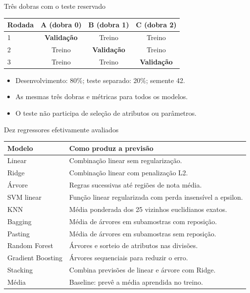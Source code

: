 \begin{frame}{Três dobras com o teste reservado}
\centering\begin{tabular}{lccc}\toprule Rodada & A (dobra 0) & B (dobra 1) & C (dobra 2)\\\midrule 1 & \textbf{Validação} & Treino & Treino\\2 & Treino & \textbf{Validação} & Treino\\3 & Treino & Treino & \textbf{Validação}\\\bottomrule\end{tabular}
\vspace{4mm}\begin{itemize}\item Desenvolvimento: 80\%; teste separado: 20\%; semente 42.
\item As mesmas três dobras e métricas para todos os modelos.
\item O teste não participa de seleção de atributos ou parâmetros.\end{itemize}
\end{frame}
\begin{frame}{Dez regressores efetivamente avaliados}
\small\begin{tabular}{p{3.1cm}p{10cm}}\toprule Modelo & Como produz a previsão\\\midrule
Linear & Combinação linear sem regularização.\\
Ridge & Combinação linear com penalização L2.\\
Árvore & Regras sucessivas até regiões de nota média.\\
SVM linear & Função linear regularizada com perda insensível a epsilon.\\
KNN & Média ponderada dos 25 vizinhos euclidianos exatos.\\
Bagging & Média de árvores em subamostras com reposição.\\
Pasting & Média de árvores em subamostras sem reposição.\\
Random Forest & Árvores e sorteio de atributos nas divisões.\\
Gradient Boosting & Árvores sequenciais para reduzir o erro.\\
Stacking & Combina previsões de linear e árvore com Ridge.\\
Média & Baseline: prevê a média aprendida no treino.\\\bottomrule\end{tabular}
\end{frame}
